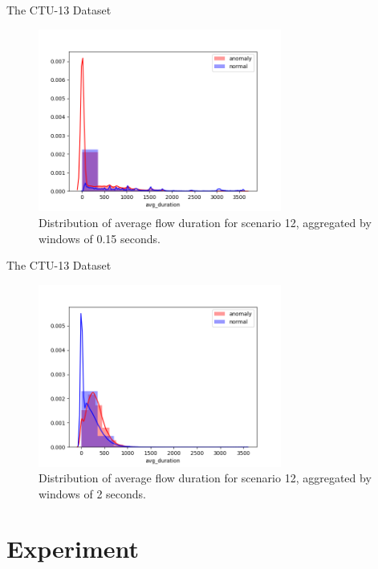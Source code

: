\documentclass[newPxFont, numfooter, sectionpages]{beamer}
\begin{document}
\begin{frame}[c]{The CTU-13 Dataset}
	\begin{figure}[h!]
	     \centering
	     \includegraphics[width=8cm]{figures/agg_distplot_0_15s_12_avg_duration.png}
	     \caption{Distribution of average flow duration for scenario 12, aggregated by windows of 0.15 seconds.}
	     \label{fig:fig07}
	\end{figure}
\end{frame}

\begin{frame}[c]{The CTU-13 Dataset}
	\begin{figure}[h!]
	     \centering
	     \includegraphics[width=8cm]{figures/agg_distplot_2s_12_avg_duration.png}
	     \caption{Distribution of average flow duration for scenario 12, aggregated by windows of 2 seconds.}
	     \label{fig:fig08}
	\end{figure}
\end{frame}


\section{Experiment}
\end{document}
